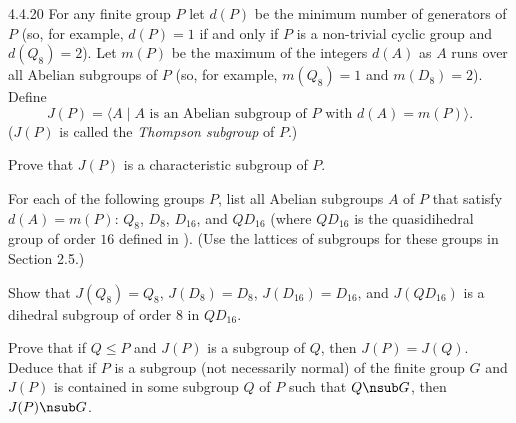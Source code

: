 \begin{spex}{4.4.20}
	For any finite group $P$ let $d(P)$ be the minimum number of generators of $P$ (so, for example, $d(P)=1$ if and only if $P$ is a non-trivial cyclic group and $d(Q_8)=2$).
	Let $m(P)$ be the maximum of the integers $d(A)$ as $A$ runs over all Abelian subgroups of $P$ (so, for example, $m(Q_8)=1$ and $m(D_8)=2$).
	Define
	\[
		J(P)=\langle A \mid A \text{ is an Abelian subgroup of } P \text{ with } d(A)=m(P)\rangle.
	\]
	($J(P)$ is called the \emph{Thompson subgroup} of $P$.)
	\begin{subexercises}
		\item Prove that $J(P)$ is a characteristic subgroup of $P$.
		\item For each of the following groups $P$, list all Abelian subgroups $A$ of $P$ that satisfy $d(A)=m(P)$: $Q_8$, $D_8$, $D_{16}$, and $QD_{16}$ (where $QD_{16}$ is the quasidihedral group of order $16$ defined in ). (Use the lattices of subgroups for these groups in Section 2.5.)
		\item Show that $J(Q_8)=Q_8$, $J(D_8)=D_8$, $J(D_{16})=D_{16}$, and $J(QD_{16})$ is a dihedral subgroup of order $8$ in $QD_{16}$.
		\item Prove that if $Q\le P$ and $J(P)$ is a subgroup of $Q$, then $J(P)=J(Q)$.
		Deduce that if $P$ is a subgroup (not necessarily normal) of the finite group $G$ and $J(P)$ is contained in some subgroup $Q$ of $P$ such that $Q \nsub G$, then $J(P) \nsub G$.
	\end{subexercises}
\end{spex}

